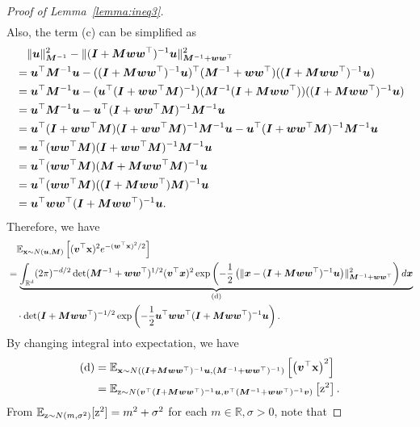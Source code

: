 \begin{proof}[Proof of Lemma~\ref{lemma:ineq3}]
\begin{align*}
\end{align*}
Also, the term (c) can be simplified as
\begin{align*}
&\quad \lVert {\bm{u}} \rVert_{{\bm{M}}^{-1}}^2 - \lVert ({\bm{I}}+{\bm{M}}{\bm{w}}{\bm{w}}^\top)^{-1}{\bm{u}} \rVert_{{\bm{M}}^{-1} + {\bm{w}}{\bm{w}}^\top}^2\\
&= {\bm{u}}^\top {\bm{M}}^{-1} {\bm{u}} - (({\bm{I}}+{\bm{M}}{\bm{w}}{\bm{w}}^\top)^{-1}{\bm{u}})^\top ({\bm{M}}^{-1} + {\bm{w}}{\bm{w}}^\top )(({\bm{I}}+{\bm{M}}{\bm{w}}{\bm{w}}^\top)^{-1}{\bm{u}})\\
&= {\bm{u}}^\top {\bm{M}}^{-1} {\bm{u}} - ({\bm{u}}^\top ({\bm{I}}+{\bm{w}}{\bm{w}}^\top {\bm{M}})^{-1}
) ({\bm{M}}^{-1} ({\bm{I}} + {\bm{M}} {\bm{w}}{\bm{w}}^\top ))(({\bm{I}}+{\bm{M}}{\bm{w}}{\bm{w}}^\top)^{-1}{\bm{u}})\\
&= {\bm{u}}^\top {\bm{M}}^{-1} {\bm{u}} - {\bm{u}}^\top ({\bm{I}}+{\bm{w}}{\bm{w}}^\top {\bm{M}})^{-1} {\bm{M}}^{-1}{\bm{u}}\\
&= {\bm{u}}^\top ({\bm{I}}+{\bm{w}}{\bm{w}}^\top {\bm{M}}) ({\bm{I}}+{\bm{w}}{\bm{w}}^\top {\bm{M}})^{-1} {\bm{M}}^{-1} {\bm{u}} - {\bm{u}}^\top ({\bm{I}}+ {\bm{w}}{\bm{w}}^\top {\bm{M}})^{-1}{\bm{M}}^{-1}{\bm{u}}\\
&= {\bm{u}}^\top ({\bm{w}}{\bm{w}}^\top {\bm{M}})({\bm{I}}+{\bm{w}}{\bm{w}}^\top {\bm{M}})^{-1} {\bm{M}}^{-1}{\bm{u}}\\
&=  {\bm{u}}^\top ({\bm{w}}{\bm{w}}^\top{\bm{M}})({\bm{M}}+{\bm{M}} {\bm{w}}{\bm{w}}^\top {\bm{M}})^{-1}{\bm{u}}\\
&= {\bm{u}}^\top ({\bm{w}}{\bm{w}}^\top {\bm{M}} ) (({\bm{I}} + {\bm{M}}{\bm{w}}{\bm{w}}^\top) {\bm{M}})^{-1} {\bm{u}}\\
&= {\bm{u}}^\top {\bm{w}}{\bm{w}}^\top ({\bm{I}}+ {\bm{M}}{\bm{w}}{\bm{w}}^\top)^{-1} {\bm{u}}.
\end{align*}
Therefore, we have 
\begin{align*}
&\quad \mathbb{E}_{{\mathbf{x}} \sim N({\bm{u}},{\bm{M}})} \left[ ({\bm{v}}^\top {\mathbf{x}})^2 e^{-({\bm{w}}^\top {\mathbf{x}})^2/2}\right]\\
&= \underbrace{ \int_{\mathbb{R}^d} (2\pi)^{-d/2} \det({\bm{M}}^{-1} + {\bm{w}} {\bm{w}}^\top)^{1/2} ({\bm{v}}^\top {\bm{x}})^2 \exp\left( -\frac{1}{2} \left(\lVert {\bm{x}}-({\bm{I}}+{\bm{M}}{\bm{w}}{\bm{w}}^\top)^{-1}{\bm{u}}\right)\rVert _{{\bm{M}}^{-1}+ {\bm{w}}{\bm{w}}^\top}^2 \right) d{\bm{x}}}_{\mathrm{(d)}}\\
& \quad \cdot \det ({\bm{I}}+{\bm{M}}{\bm{w}}{\bm{w}}^\top)^{-1/2} \exp \left( -\frac{1}{2} {\bm{u}}^\top {\bm{w}}{\bm{w}}^\top  ({\bm{I}}+{\bm{M}}{\bm{w}}{\bm{w}}^\top)^{-1} {\bm{u}} \right).
\end{align*}
By changing integral into expectation, we have
\begin{align*}
\mathrm{(d)} &= \mathbb{E}_{{\mathbf{x}} \sim N\left( ({\bm{I}}+{\bm{M}}{\bm{w}}{\bm{w}}^\top)^{-1}{\bm{u}}, ({\bm{M}}^{-1}+ {\bm{w}}{\bm{w}}^\top)^{-1} \right)}\left[\left({\bm{v}}^\top {\mathbf{x}}\right)^2\right]\\
&= \mathbb{E}_{{\textnormal{z}} \sim N\left( {\bm{v}}^\top({\bm{I}}+{\bm{M}}{\bm{w}}{\bm{w}}^\top)^{-1}{\bm{u}}, {\bm{v}}^\top({\bm{M}}^{-1}+ {\bm{w}}{\bm{w}}^\top)^{-1}{\bm{v}} \right)}\left[{\textnormal{z}}^2\right].
\end{align*}
From $\mathbb{E}_{{\textnormal{z}} \sim N(m, \sigma^2)}[{\textnormal{z}}^2] = m^2+\sigma^2$ for each $m \in \mathbb{R}, \sigma >0$, note that

\end{proof}
